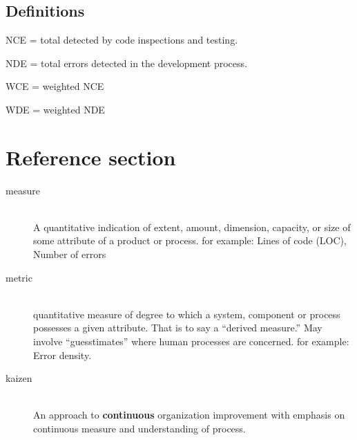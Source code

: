 \documentclass{article}
\begin{document}
\subsection{Definitions}

\begin{flushleft}
  \item NCE = total detected by code inspections and testing.
  \item NDE = total errors detected in the development process.
  \item WCE = weighted NCE
  \item WDE = weighted NDE
\end{flushleft}


\pagebreak
\section*{Reference section} \label{sec:reference}
\begin{description}
	\item[measure] \hfill \\ A quantitative indication of extent, amount, dimension, capacity, or size of some attribute of a product or process. for example: Lines of code (LOC), Number of errors
	\item[metric] \hfill \\ quantitative measure of degree to which a system, component or process possesses a given attribute. That is to say a “derived measure.” May involve “guesstimates” where human processes are concerned. for example: Error density.
	\item[kaizen] \hfill \\ An approach to \textbf{continuous} organization improvement with emphasis on continuous measure and understanding of process.
\end{description}
\end{document}
